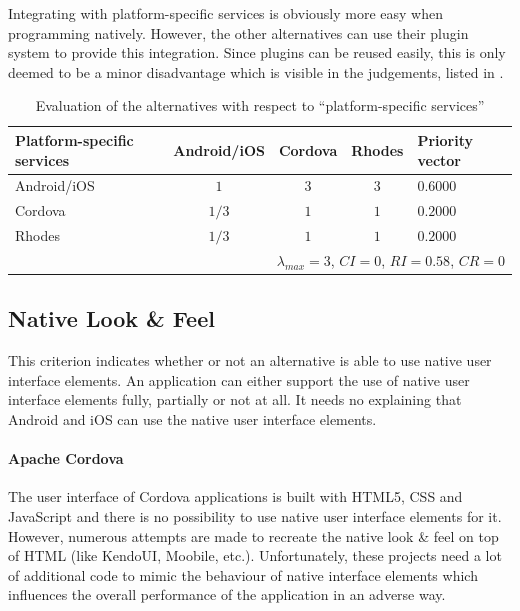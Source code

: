 Integrating with platform-specific services is obviously more easy when programming natively. However, the other alternatives can use their plugin system to provide this integration. Since plugins can be reused easily, this is only deemed to be a minor disadvantage which is visible in the judgements, listed in . 

\begin{table}[h!]
    \centering
    \begin{tabular}{lcccl}
        \hline
        \textbf{Platform-specific services} & Android/iOS & Cordova & Rhodes & Priority vector \\
        \hline
        Android/iOS          & $1$         & $3$     & $3$   & $0.6000$        \\
        Cordova              & $1/3$       & $1$     & $1$   & $0.2000$        \\
        Rhodes               & $1/3$       & $1$     & $1$   & $0.2000$        \\
        \hline
        \multicolumn{5}{r}{$\lambda_{max} = 3$, $CI = 0$, $RI = 0.58$, $CR = 0$}\\
        \hline
    \end{tabular}
    \caption{Evaluation of the alternatives with respect to ``platform-specific services''}
    \label{tab:pss}
\end{table}

\subsection{Native Look \& Feel}

This criterion indicates whether or not an alternative is able to use native user interface elements. An application can either support the use of native user interface elements fully, partially or not at all. It needs no explaining that Android and iOS can use the native user interface elements.

\paragraph{Apache Cordova} The user interface of Cordova applications is built with HTML5, CSS and JavaScript and there is no possibility to use native user interface elements for it. However, numerous attempts are made to recreate the native look \& feel on top of HTML (like KendoUI, Moobile, etc.). Unfortunately, these projects need a lot of additional code to mimic the behaviour of native interface elements which influences the overall performance of the application in an adverse way.

